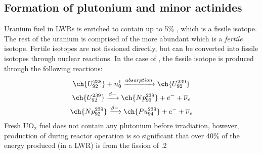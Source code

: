 \subsection{Formation of plutonium and minor actinides}

Uranium fuel in LWRs is enriched to contain up to 5\% , which is a fissile isotope. The rest of the uranium is comprised of the more abundant  which is a \emph{fertile} isotope. Fertile isotopes are not fissioned directly, but can be converted into fissile isotopes through nuclear reactions. In the case of , the fissile isotope  is produced through the following reactions:
\begin{gather}
\ch{U^{238}_{92}} + n^{1}_{0} \xrightarrow[]{absorption} \ch{U^{239}_{92}} \\
\ch{U^{239}_{92}} \xrightarrow[]{\beta-} \ch{Np^{239}_{93}} + e^{-} + \overline{\nu}_{e} \\
\ch{Np^{239}_{92}} \xrightarrow[]{\beta-} \ch{Pu^{239}_{94}} + e^{-} + \overline{\nu}_{e}
\end{gather}
Fresh UO$_{2}$ fuel does not contain any plutonium before irradiation, however, production of  during reactor operation is so significant that over 40\% of the energy produced (in a LWR) is from the fission of .2
